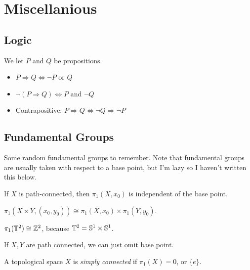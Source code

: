 \section{Miscellanious}

\subsection{Logic}
We let $P$ and $Q$ be propositions.

\begin{itemize}
\item $P\Rightarrow Q \iff \neg P\text{ or }Q$
\item $\neg (P\Rightarrow Q) \iff P\text{ and } \neg Q$
\item Contrapositive: $P\Rightarrow Q \iff \neg Q\Rightarrow \neg P$
\end{itemize}

\subsection{Fundamental Groups}

Some random fundamental groups to remember. Note that fundamental groups 
are usually taken with respect to a base point, but I'm lazy so I haven't written this below.

\begin{proposition}
If $X$ is path-connected, then $\pi_1(X, x_0)$ is independent of the 
base point.
\end{proposition}

\begin{proposition}
$\pi_1(X \times Y, (x_0, y_0)) \cong \pi_1(X, x_0) \times \pi_1(Y, y_0)$.
\end{proposition}

\begin{example}
$\pi_1(\mathbb{T}^2) \cong \mathbb{Z}^2$, because $\mathbb{T}^2 = \mathbb{S}^1 \times \mathbb{S}^1$.
\end{example}

\begin{remark}
If $X, Y$ are path connected, we can just omit base point.
\end{remark}

\begin{df}
A topological space $X$ is \emph{simply connected} if $\pi_1(X) = 0$, or $\{e\}$.
\end{df}

